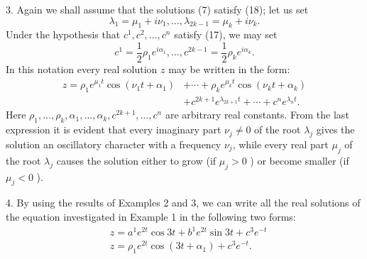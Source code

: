 \documentclass[10pt,a5paper]{book}
\theoremstyle{plain}
\theoremstyle{definition}
\theoremstyle{remark}
\begin{document}
3. Again we shall assume that the solutions (7) satisfy (18); let us set
\[
\lambda_{1}=\mu_{1}+i \nu_{1}, \ldots, \lambda_{2 k-1}=\mu_{k}+i \nu_{k} .
\]
Under the hypothesis that $c^{1}, c^{2}, \ldots, c^{n}$ satisfy (17), we may set
\[
c^{1}=\frac{1}{2} \rho_{1} e^{i \alpha_{1}}, \ldots, c^{2 k-1}=\frac{1}{2} \rho_{k} e^{i \alpha_{k}} .
\]
In this notation every real solution $z$ may be written in the form:
\[
\begin{aligned}
z=\rho_{1} e^{\mu_{1} t} \cos \left(\nu_{1} t+\alpha_{1}\right) & +\cdots+\rho_{k} e^{\mu_{k} t} \cos \left(\nu_{k} t+\alpha_{k}\right) \\
& +c^{2 k+1} e^{\lambda_{2 k+1} t}+\cdots+c^{n} e^{\lambda_{n} t} .
\end{aligned}
\]
Here $\rho_{1}, \ldots, \rho_{k}, \alpha_{1}, \ldots, \alpha_{k}, c^{2 k+1}, \ldots, c^{n}$ are arbitrary real constants. From the last expression it is evident that every imaginary part $\nu_{j} \neq 0$ of the root $\lambda_{j}$ gives the solution an oscillatory character with a frequency $\nu_{j}$, while every real part $\mu_{j}$ of the root $\lambda_{j}$ causes the solution either to grow (if $\mu_{j}>0$ ) or become smaller (if $\mu_{j}<0$ ).

4. By using the results of Examples 2 and 3, we can write all the real solutions of the equation investigated in Example 1 in the following two forms:
\[
\begin{aligned}
& z=a^{1} e^{2 t} \cos 3 t+b^{1} e^{2 t} \sin 3 t+c^{3} e^{-t} \\
& z=\rho_{1} e^{2 t} \cos \left(3 t+\alpha_{1}\right)+c^{3} e^{-t}.
\end{aligned}
\]
\end{document}
